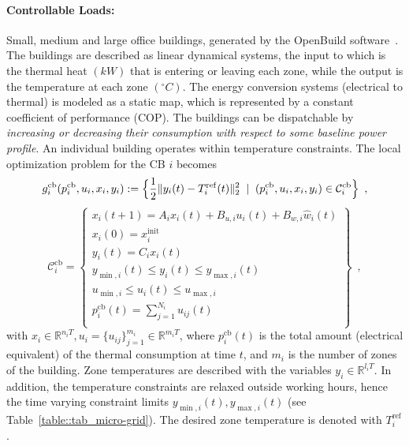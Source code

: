 \documentclass[envcountsect]{svjour3}
\newcommand{\reals}{{\mathbb{R} }}
\begin{document}
\paragraph{Controllable Loads:} Small, medium and large office buildings, generated by the OpenBuild software~\cite{OpenBuild}. The buildings are described as linear dynamical systems,
the input to which is the thermal heat $(kW)$ that is entering or leaving each zone, while the output is the temperature at each zone $({}^\circ C)$.
The energy conversion systems (electrical to thermal) is modeled as a static map, which is represented by a constant coefficient of performance (COP).
The buildings can be dispatchable by \emph{increasing or decreasing their consumption with respect to some baseline power profile}.
An individual building operates within temperature constraints. The local optimization problem for the CB $i$ becomes
\begin{equation}{\label{eq::BuildingProgram}}
g^\mathrm{cb}_i(p^{\mathrm{cb}}_i,u_i,x_i,y_i) := \Big\{\frac{1}{2}\|y_i(t)-T_i^\mathrm{ref}(t)\|^2_2
                                             \;\mid\;(p^{\mathrm{cb}}_i,u_i,x_i,y_i)\in\mathcal{C}^\mathrm{cb}_i \Big\}\enspace,
\end{equation}
\[
\mathcal{C}^\mathrm{cb}_i =
\left \{
                  \begin{array}{ll}
                    x_i(t+1) = A_ix_i(t)+B_{u,i}u_i(t)+B_{w,i}\hat{w}_i(t) \\
                    x_i(0) = x_i^\mathrm{init} \\
                    y_i(t) =C_ix_i(t) \\
                    y_{\min,i}(t)\leq y_i(t)\leq y_{\max,i}(t) \\
                    u_{\min,i}\leq u_i(t)\leq u_{\max,i} \\
                    p^{\mathrm{cb}}_i(t) = \sum_{j=1}^{N_i}u_{ij}(t) \\
                  \end{array}
\right\}\enspace,
\]
with $x_i\in\reals^{n_iT},u_i=\{u_{ij}\}_{j=1}^{m_i}\in\reals^{m_iT}$, where $p^{\mathrm{cb}}_i(t)$ is the total amount (electrical equivalent)
of the thermal consumption at time $t$, and $m_i$ is the number of zones of the building. Zone temperatures are described with the variables $y_i\in\reals^{l_iT}$.
In addition, the temperature constraints are relaxed outside working hours, hence the time varying constraint limits $y_{\min,i}(t), y_{\max,i}(t)$
(see Table~\ref{table::tab_micro-grid}). The desired zone temperature is denoted with $T_i^\mathrm{ref}$.
\end{document}
